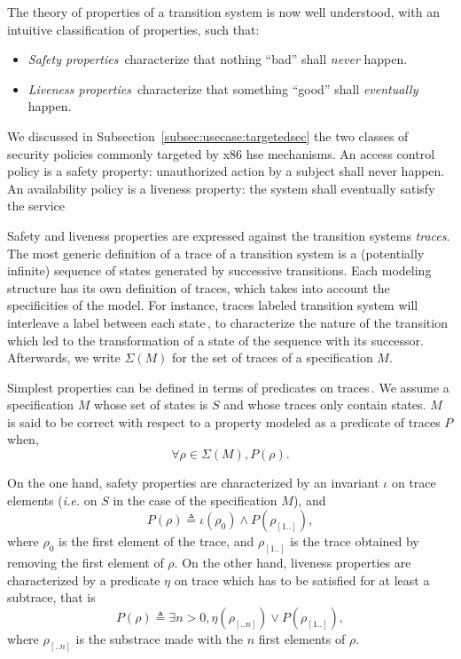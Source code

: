 The theory of properties of a transition system is now well understood, with an
intuitive classification of properties, such that:
%
\begin{itemize}
\item \emph{Safety properties}\,\cite{lamport1977proving,lamport1985logical}
  characterize that nothing ``bad'' shall \emph{never} happen.
\item \emph{Liveness properties}\,\cite{lamport1985logical,alpern1985liveness}
  characterize that something ``good'' shall \emph{eventually} happen.
\end{itemize}

We discussed in Subsection~\ref{subsec:usecase:targetedsec} the two classes of
security policies commonly targeted by x86 \ac{hse} mechanisms.
%
An access control policy is a safety property: unauthorized action by a subject
shall never happen.
%
An availability policy is a liveness property: the system shall eventually
satisfy the service

Safety and liveness properties are expressed against the transition systems
\emph{traces}.
%
The most generic definition of a trace of a transition system is a (potentially
infinite) sequence of states generated by successive transitions.
%
Each modeling structure has its own definition of traces, which takes into
account the specificities of the model.
%
For instance, traces labeled transition system will interleave a label between
each state\,\cite{vijayaraghavan2015modular}, to characterize the nature of the
transition which led to the transformation of a state of the sequence with its
successor.
%
Afterwards, we write \( \Sigma(M) \) for the set of traces of a specification
\( M \).

Simplest properties can be defined in terms of predicates on
traces\,\cite{alpern1987recognizing,schneider2000enforceable,basin2013enforceable}.
%
We assume a specification \( M \) whose set of states is \( S \) and whose
traces only contain states.
%
\( M \) is said to be correct with respect to a property modeled as a predicate
of traces \( P \) when,
%
\[
  \forall \rho \in \Sigma(M), P(\rho).
\]

On the one hand, safety properties are characterized by an invariant \( \iota \)
on trace elements (\emph{i.e.} on \( S \) in the case of the specification
\( M \)), and
%
\[
  P(\rho) \triangleq \iota(\rho_0) \wedge P(\rho_{[1..]}),
\]
%
where \( \rho_0 \) is the first element of the trace, and \( \rho_{[1..]} \) is
the trace obtained by removing the first element of \( \rho \).
%
On the other hand, liveness properties are characterized by a predicate
\( \eta \) on trace which has to be satisfied for at least a subtrace, that is
%
\[
  P(\rho) \triangleq \exists n > 0, \eta(\rho_{[..n]}) \vee P(\rho_{[1..]}),
\]
%
where \( \rho_{[..n]} \) is the substrace made with the \( n \) first elements
of \( \rho \).

